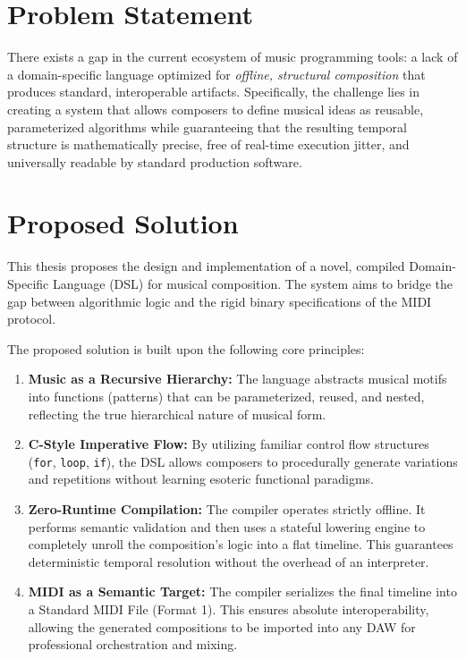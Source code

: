 \section{Problem Statement}

There exists a gap in the current ecosystem of music programming tools: a lack of a domain-specific language
optimized for \textit{offline, structural composition} that produces standard, interoperable artifacts.
Specifically, the challenge lies in creating a system that allows composers to define musical ideas as
reusable, parameterized algorithms while guaranteeing that the resulting temporal structure is mathematically
precise, free of real-time execution jitter, and universally readable by standard production software.

\section{Proposed Solution}

This thesis proposes the design and implementation of a novel, compiled Domain-Specific Language (DSL) for
musical composition. The system aims to bridge the gap between algorithmic logic and the rigid binary
specifications of the MIDI protocol.

The proposed solution is built upon the following core principles:
\begin{enumerate}
  \item \textbf{Music as a Recursive Hierarchy:} The language abstracts musical motifs into functions
    (patterns) that can be parameterized, reused, and nested, reflecting the true hierarchical nature of musical form.
  \item \textbf{C-Style Imperative Flow:} By utilizing familiar control flow structures (\texttt{for},
    \texttt{loop}, \texttt{if}), the DSL allows composers to procedurally generate variations and repetitions
    without learning esoteric functional paradigms.
  \item \textbf{Zero-Runtime Compilation:} The compiler operates strictly offline. It performs semantic
    validation and then uses a stateful lowering engine to completely unroll the composition's logic into a
    flat timeline. This guarantees deterministic temporal resolution without the overhead of an interpreter.
  \item \textbf{MIDI as a Semantic Target:} The compiler serializes the final timeline into a Standard MIDI
    File (Format 1). This ensures absolute interoperability, allowing the generated compositions to be
    imported into any DAW for professional orchestration and mixing.
\end{enumerate}

